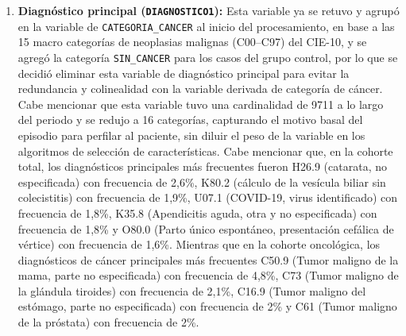 \begin{enumerate}
    \item \textbf{Diagnóstico principal (\texttt{DIAGNOSTICO1}):} Esta variable ya se retuvo y agrupó en la variable de \texttt{CATEGORIA\_CANCER} al inicio del procesamiento, en base a las 15 macro categorías de neoplasias malignas (C00--C97) del CIE-10, y se agregó la categoría \texttt{SIN\_CANCER} para los casos del grupo control, por lo que se decidió eliminar esta variable de diagnóstico principal para evitar la redundancia y colinealidad con la variable derivada de categoría de cáncer. Cabe mencionar que esta variable tuvo una cardinalidad de 9711 a lo largo del periodo y se redujo a 16 categorías, capturando el motivo basal del episodio para perfilar al paciente, sin diluir el peso de la variable en los algoritmos de selección de características. Cabe mencionar que, en la cohorte total, los diagnósticos principales más frecuentes fueron H26.9 (catarata, no especificada) con frecuencia de 2,6\%, K80.2 (cálculo de la vesícula biliar sin colecistitis) con frecuencia de 1,9\%, U07.1 (COVID-19, virus identificado) con frecuencia de 1,8\%, K35.8 (Apendicitis aguda, otra y no especificada) con frecuencia de 1,8\% y O80.0 (Parto único espontáneo, presentación cefálica de vértice) con frecuencia de 1,6\%. Mientras que en la cohorte oncológica, los diagnósticos de cáncer principales más frecuentes C50.9 (Tumor maligno de la mama, parte no especificada) con frecuencia de 4,8\%, C73 (Tumor maligno de la glándula tiroides) con frecuencia de 2,1\%, C16.9 (Tumor maligno del estómago, parte no especificada) con frecuencia de 2\% y C61 (Tumor maligno de la próstata) con frecuencia de 2\%.

\end{enumerate}
